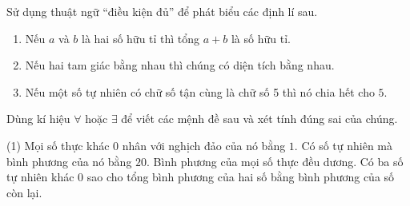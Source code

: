 \begin{baitap}%
	Sử dụng thuật ngữ ``điều kiện đủ'' để phát biểu các định lí sau.
	\begin{enumerate}
		\item Nếu $a$ và $b$ là hai số hữu tỉ thì tổng $a+b$ là số hữu tỉ.
		\item Nếu hai tam giác bằng nhau thì chúng có diện tích bằng nhau.
		\item Nếu một số tự nhiên có chữ số tận cùng là chữ số 5 thì nó chia hết cho $5$.
	\end{enumerate}
\end{baitap}

\begin{baitap}%
	Dùng kí hiệu $\forall$ hoặc $\exists$ để viết các mệnh đề sau và xét tính đúng sai của chúng.
	\begin{tasks}(1)
		\task Mọi số thực khác $0$ nhân với nghịch đảo của nó bằng $1$.
		\task Có số tự nhiên mà bình phương của nó bằng $20$.
		\task Bình phương của mọi số thực đều dương.
		\task Có ba số tự nhiên khác $0$ sao cho tổng bình phương của hai số bằng bình phương của số còn lại.
	\end{tasks}
\end{baitap}

